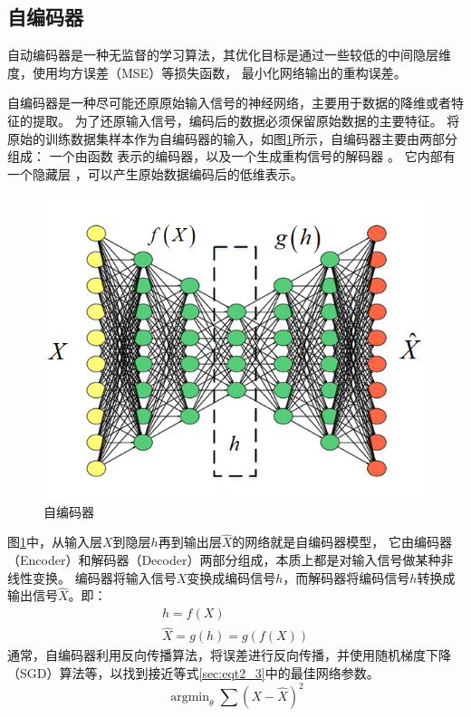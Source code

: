 \subsection{自编码器}
自动编码器是一种无监督的学习算法，其优化目标是通过一些较低的中间隐层维度，使用均方误差（MSE）等损失函数，
最小化网络输出的重构误差。\par
自编码器是一种尽可能还原原始输入信号的神经网络，主要用于数据的降维或者特征的提取。
为了还原输入信号，编码后的数据必须保留原始数据的主要特征。
将原始的训练数据集样本作为自编码器的输入，如图\ref{sec:fig_2_5}所示，自编码器主要由两部分组成：
一个由函数 表示的编码器，以及一个生成重构信号的解码器 。
它内部有一个隐藏层 ，可以产生原始数据编码后的低维表示。
\begin{figure}[!h]
	\centering
	\includegraphics[scale=0.7]{figures/chapter_2/fig_2_5}
	\caption{自编码器}	\label{sec:fig_2_5}
\end{figure}
图\ref{sec:fig_2_5}中，从输入层$X$到隐层$h$再到输出层$\hat{X}$的网络就是自编码器模型，
它由编码器（Encoder）和解码器（Decoder）两部分组成，本质上都是对输入信号做某种非线性变换。
编码器将输入信号$X$变换成编码信号$h$，而解码器将编码信号$h$转换成输出信号$\hat{X}$。即：
\begin{equation}
	\begin{gathered}
		h=f(X)
		\\
		\hat{X}=g(h)=g(f(X))
	\end{gathered}
\end{equation}
通常，自编码器利用反向传播算法，将误差进行反向传播，并使用随机梯度下降（SGD）算法等，以找到接近等式\ref{sec:eqt2_3}中的最佳网络参数。
\begin{equation}\label{sec:eqt2_3}
\mathop{\arg\min}_{\theta} \sum(X − \hat{X})^2
\end{equation}
